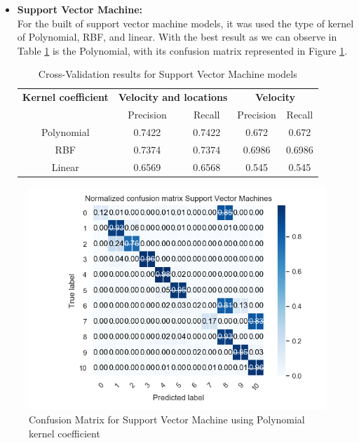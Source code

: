 \begin{itemize}
\newpage
\item \textbf{Support Vector Machine: }\\
For the built of support vector machine models, it was used the type of kernel of Polynomial, RBF, and linear. With the best result as we can observe in Table \ref{table:cross_val_svm} is the Polynomial, with its confusion matrix represented in Figure \ref{fig:cm_cvm}. 



\begin {table}[H]
\caption {Cross-Validation results for Support Vector Machine models}
\begin{center}
\begin{tabular}{c|c|c|c|c}
\multicolumn{1}{c|}{\textbf{Kernel coefficient } } &\multicolumn{2}{c|}{\textbf{ Velocity and locations}}& \multicolumn{2}{c}{\textbf{ Velocity}}\\
&Precision & Recall & Precision & Recall \\
\hline
Polynomial &0.7422&0.7422&0.672&0.672\\
RBF &0.7374&0.7374&0.6986&0.6986\\
Linear &0.6569&0.6568&0.545&0.545
\label{table:cross_val_svm}
\end{tabular}
\end{center}
\end {table}

\end{itemize}

\begin{figure}[h]
\centering
\includegraphics[width=0.8\linewidth]{Chapters/img/CM_SVM.png}
\caption{Confusion Matrix for Support Vector Machine using Polynomial kernel coefficient}
\label{fig:cm_cvm}
\end{figure}


